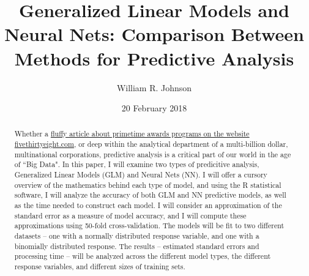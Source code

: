 \documentclass[12pt]{article}\usepackage[]{graphicx}\usepackage[]{color}
\begin{document}
	\title{Generalized Linear Models and Neural Nets: Comparison Between Methods for Predictive Analysis}
	\author{William R. Johnson}
	\date{20 February 2018}
	\maketitle

	\renewcommand{\abstractname}{Abstract:}
	\begin{abstract}
		Whether a \href{https://fivethirtyeight.com/features/oscars-2018-early-predictions-nominations/}{fluffy article about primetime 
awards programs on the website fivethirtyeight.com}, or deep within the analytical 
department of a multi-billion dollar, multinational corporations, predictive analysis is a critical part of our world in the age of ``Big Data".  
In this paper, I will examine two types of predicitive analysis, Generalized Linear Models (GLM) and Neural Nets (NN).  I will offer a cursory 
overview of the mathematics behind each type of model, and using the R statistical software, I will analyze the accuracy of both GLM and NN 
predictive models, as well as the time needed to construct each model. I will consider an approximation of the standard error as a measure of model 
accuracy, and I will compute these approximations using 50-fold cross-validation.  The models will be fit to two different datasets -- one with a 
normally distributed response variable, and one with a binomially distributed response.  The results -- estimated standard errors and processing 
time -- will be analyzed across the different model types, the different response variables, and different sizes of training sets.
	\end{abstract}
	\vfill\eject



\end{document}
